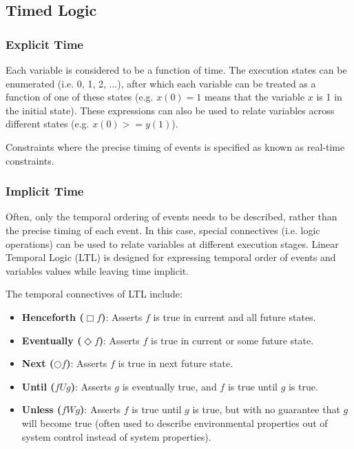 \documentclass[12pt,titlepage]{article}
\begin{document}
    \subsection{Timed Logic}

      \subsubsection{Explicit Time}
        Each variable is considered to be a function of time. The execution states can be enumerated (i.e. 0, 1, 2, ...), after which each variable can be treated
        as a function of one of these states (e.g. $x(0) = 1$ means that the variable $x$ is 1 in the initial state). These expressions can also be used to relate
        variables across different states (e.g. $x(0) >= y(1)$).

        Constraints where the precise timing of events is specified as known as real-time constraints.

      \subsubsection{Implicit Time}
        Often, only the temporal ordering of events needs to be described, rather than the precise timing of each event. In this case, special connectives
        (i.e. logic operations) can be used to relate variables at different execution stages. Linear Temporal Logic (LTL) is designed for expressing
        temporal order of events and variables values while leaving time implicit.

        The temporal connectives of LTL include:
        \begin{itemize}
          \item \textbf{Henceforth ($\Box f$)}: Asserts $f$ is true in current and all future states.
          \item \textbf{Eventually ($\Diamond f$)}: Asserts $f$ is true in current or some future state.
          \item \textbf{Next ($\Circle f$)}: Asserts $f$ is true in next future state.
          \item \textbf{Until ($f U g$)}: Asserts $g$ is eventually true, and $f$ is true until $g$ is true.
          \item \textbf{Unless ($f W g$)}: Asserts $f$ is true until $g$ is true, but with no guarantee that $g$ will become true (often used to describe environmental
            properties out of system control instead of system properties).
        \end{itemize}
\end{document}
